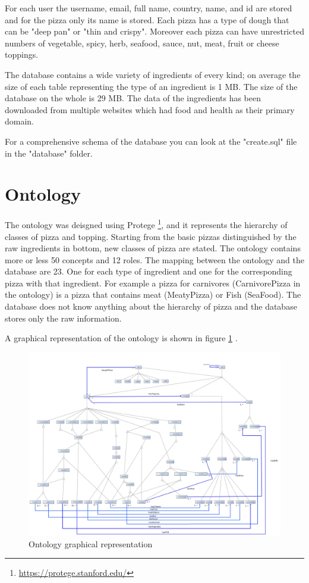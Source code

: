 \documentclass[10pt,a4paper]{article}
\begin{document}
For each user the username, email, full name, country, name, and id are stored and for the pizza only its name is stored. 
Each pizza has a type of dough that can be "deep pan"  or "thin and crispy". Moreover each pizza can have unrestricted numbers of vegetable, spicy, herb, seafood, sauce, nut, meat, fruit or cheese toppings.

The database contains a wide variety of ingredients of every kind; on average the size of each table representing the type of an ingredient is 1 MB. The size of the database on the whole is 29 MB. The data of the ingredients has been downloaded from multiple websites which had food and health as their primary domain. 

For a comprehensive schema of the database you can look at the "create.sql" file in the "database" folder.

\section*{Ontology}
The ontology was deisgned using Protege \footnote{\url{https://protege.stanford.edu/}}, and it represents the hierarchy of classes of pizza and topping. Starting from the basic pizzas distinguished by the raw ingredients in bottom, new classes of pizza are stated. 
The ontology contains more or less 50 concepts and 12 roles. The mapping between the ontology and the database are 23. One for each type of ingredient and one for the corresponding pizza with that ingredient. For example a pizza for carnivores (CarnivorePizza in the ontology) is a pizza that contains meat (MeatyPizza) or Fish (SeaFood).  The database does not know anything about the hierarchy of pizza and the database stores only the raw information.

A graphical representation of the ontology is shown in figure \ref{ONTO} .
\begin{figure}
  \includegraphics[width=\linewidth]{ontologygraph.jpg}
  \caption{Ontology graphical representation}
  \label{ONTO}
\end{figure}
\end{document}
